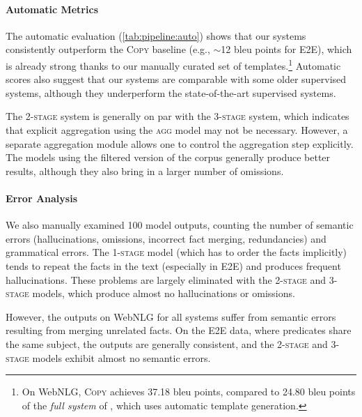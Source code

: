 \documentclass[12pt,notitlepage,a4paper,oneside,openany]{report}
\newcommand{\baselinecopy}{\textsc{Copy}}
\begin{document}
\paragraph{Automatic Metrics}

The automatic evaluation (\autoref{tab:pipeline:auto}) shows that our systems consistently outperform the \baselinecopy{} baseline (e.g., $\sim$12 \acs{bleu} points for E2E), which is already strong thanks to our manually curated set of templates.\footnote{On WebNLG, \baselinecopy{} achieves 37.18 \acs{bleu} points, compared to 24.80 \acs{bleu} points of the \textit{full system} of \citet{laha2020scalable}, which uses automatic template generation.} Automatic scores also suggest that our systems are comparable with some older supervised systems, although they underperform the state-of-the-art supervised systems.

The \textsc{2-stage} system is generally on par with the \textsc{3-stage} system, which indicates that explicit aggregation using the \textsc{agg} model may not be necessary. However, a separate aggregation module allows one to control the aggregation step explicitly. The models using the filtered version of the corpus generally produce better results, although they also bring in a larger number of omissions.


\paragraph{Error Analysis}
We also manually examined 100 model outputs, counting the number of semantic errors (hallucinations, omissions, incorrect fact merging, redundancies) and grammatical errors. The \textsc{1-stage} model (which has to order the facts implicitly) tends to repeat the facts in the text (especially in E2E) and produces frequent hallucinations. These problems are largely eliminated with the \textsc{2-stage} and \textsc{3-stage} models, which produce almost no hallucinations or omissions.

However, the outputs on WebNLG for all systems suffer from semantic errors resulting from merging unrelated facts. On the E2E data, where predicates share the same subject, the outputs are generally consistent, and the \textsc{2-stage} and \textsc{3-stage} models exhibit almost no semantic errors.
\end{document}
